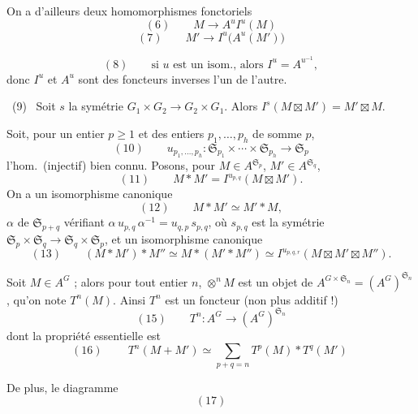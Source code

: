 \documentclass[11pt,a4paper]{article}
\begin{document}
On a d'ailleurs deux homomorphismes fonctoriels
\[ (6) \qquad M \longrightarrow A^{u} I^{u}(M) \]
\[ (7) \qquad M' \longrightarrow I^{u}\bigl(A^{u}(M')\bigr) \]
\ill{}


\[ (8) \qquad \text{si $u$ est un isom., alors } I^{u} = A^{u^{-1}} , \]
donc $I^{u}$ et $A^{u}$ sont des foncteurs inverses l'un de l'autre.

 \ (9) \ Soit $s$ la symétrie $G_{1} \times G_{2} \to
G_{2} \times G_{1}$. Alors $I^{s}(M \boxtimes M') = M' \boxtimes M$.

Soit, pour un entier $p \geq 1$ et des entiers $p_{1}, \ldots, p_{h}$ de somme
$p$,
\[ (10) \qquad u_{p_{1}, \ldots, p_{h}} : \mathfrak{S}_{p_{1}} \times \cdots
   \times \mathfrak{S}_{p_{h}} \longrightarrow \mathfrak{S}_{p} \]
l'hom.\ (injectif) bien connu. Posons, pour $M \in A^{\mathfrak{S}_{p}}$,
$M' \in A^{\mathfrak{S}_{q}}$,
\[ (11) \qquad M * M' = I^{u_{p,q}}(M \boxtimes M') . \]
On a un isomorphisme canonique
\[ (12) \qquad M * M' \simeq M' * M , \]
\struck{\ill{}} \ill{} $\alpha$  de $\mathfrak{S}_{p+q}$
vérifiant $\alpha\, u_{p,q}\, \alpha^{-1} = u_{q,p}\, s_{p,q}$, où $s_{p,q}$ est
la symétrie $\mathfrak{S}_{p} \times \mathfrak{S}_{q} \to \mathfrak{S}_{q} \times
\mathfrak{S}_{p}$, et un isomorphisme canonique
\[ (13) \qquad (M * M') * M'' \simeq M * (M' * M'') \simeq
   I^{u_{p,q,r}}(M \boxtimes M' \boxtimes M'') . \]


\struck{\ill{}}

Soit $M \in A^{G}$ ; alors pour tout entier $n$, $\otimes^{n} M$ est un objet de
$A^{G \times \mathfrak{S}_{n}} = (A^{G})^{\mathfrak{S}_{n}}$, qu'on note
$T^{n}(M)$. Ainsi $T^{n}$ est un foncteur (non plus additif !)
\[ (15) \qquad T^{n} : A^{G} \longrightarrow (A^{G})^{\mathfrak{S}_{n}} \]
dont la propriété essentielle est
\[ (16) \qquad \boxed{\ T^{n}(M + M') \simeq \sum_{p+q=n} T^{p}(M) * T^{q}(M')\ } \]


De plus, le diagramme
\[ (17) \]

\end{document}
